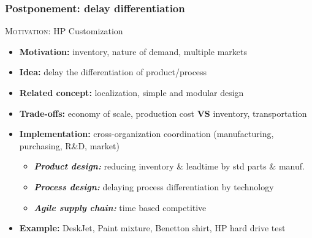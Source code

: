 \documentclass[10pt,handout,notes=show]{beamer}
\begin{document}
\begin{frame}[label=postpone]
  \frametitle{Postponement: delay differentiation \forIE}

  \textsc{Motivation:} HP Customization
  \begin{itemize}
    \item \textbf{Motivation:} inventory, nature of demand, multiple markets
    \item \textbf{Idea:} \alert{delay the differentiation} of product/process
    \item \textbf{Related concept:} localization, simple and modular design
    \item \textbf{Trade-offs:} economy of scale, production cost \textbf{VS} inventory, transportation
    \item \textbf{Implementation:} cross-organization coordination (manufacturing, purchasing, R\&D, market)
    \begin{itemize}
      \item \textbf{\textsl{Product design:}} reducing inventory \& leadtime by std parts \& manuf.
      \item \textbf{\textsl{Process design:}} delaying process differentiation by technology
      \item \textbf{\textsl{Agile supply chain:}} time based competitive
    \end{itemize}
    \item \textbf{Example:} DeskJet, Paint mixture, Benetton shirt, HP hard drive test
  \end{itemize}


\end{frame}
\end{document}

